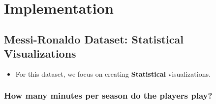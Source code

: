 \documentclass[a4paper]{article}
\begin{document}
\section{Implementation}
\subsection{Messi-Ronaldo Dataset: Statistical Visualizations}
\begin{itemize}
    \item For this dataset, we focus on creating \textbf{Statistical} visualizations. 
\end{itemize}
\subsubsection{How many minutes per season do the players play?}
\end{document}
